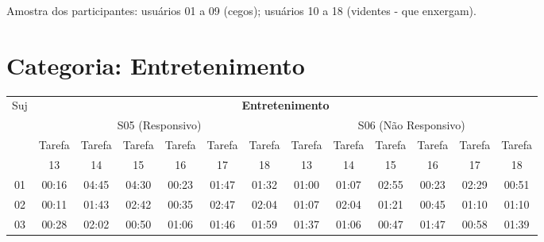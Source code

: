 Amostra dos participantes: usuários 01 a 09 (cegos); usuários 10 a 18 (videntes - que enxergam).

\section{Categoria: Entretenimento}

\footnotesize%
\begin{center}
\begin{sideways}
\begin{tabular}{|l|l|l|l|l|l|l|l|l|l|l|l|l|}
\hline
Suj & \multicolumn{12}{c|}{\textbf{Entretenimento}} \\ 
\cline{2-13}
 & \multicolumn{6}{c|}{S05 (Responsivo)} 
 & \multicolumn{6}{c|}{S06 (Não Responsivo)} \\ 
\cline{2-13}
 & \multicolumn{1}{c|}{Tarefa} & Tarefa & Tarefa & Tarefa & Tarefa & Tarefa & Tarefa & Tarefa & Tarefa & Tarefa & Tarefa & Tarefa \\ 
 & \multicolumn{1}{c|}{13} & \multicolumn{1}{c|}{14} & \multicolumn{1}{c|}{15} & \multicolumn{1}{c|}{16} & \multicolumn{1}{c|}{17} & \multicolumn{1}{c|}{18} & \multicolumn{1}{c|}{13} & \multicolumn{1}{c|}{14} & \multicolumn{1}{c|}{15} & \multicolumn{1}{c|}{16} & \multicolumn{1}{c|}{17} & \multicolumn{1}{c|}{18} \\ 
\hline
\multicolumn{1}{|c|}{01} & \multicolumn{1}{c|}{00:16} & \multicolumn{1}{c|}{04:45} & \multicolumn{1}{c|}{04:30} & \multicolumn{1}{c|}{00:23} & \multicolumn{1}{c|}{01:47} & \multicolumn{1}{c|}{01:32} & \multicolumn{1}{c|}{01:00} & \multicolumn{1}{c|}{01:07} & \multicolumn{1}{c|}{02:55} & \multicolumn{1}{c|}{00:23} & \multicolumn{1}{c|}{02:29} & \multicolumn{1}{c|}{00:51} \\ 
\hline
\multicolumn{1}{|c|}{02} & \multicolumn{1}{c|}{00:11} & \multicolumn{1}{c|}{01:43} & \multicolumn{1}{c|}{02:42} & \multicolumn{1}{c|}{00:35} & \multicolumn{1}{c|}{02:47} & \multicolumn{1}{c|}{02:04} & \multicolumn{1}{c|}{01:07} & \multicolumn{1}{c|}{02:04} & \multicolumn{1}{c|}{01:21} & \multicolumn{1}{c|}{00:45} & \multicolumn{1}{c|}{01:10} & \multicolumn{1}{c|}{01:10} \\ 
\hline
\multicolumn{1}{|c|}{03} & 
\multicolumn{1}{c|}{00:28} & \multicolumn{1}{c|}{02:02} & \multicolumn{1}{c|}{00:50} & \multicolumn{1}{c|}{01:06} & \multicolumn{1}{c|}{01:46}	& \multicolumn{1}{c|}{01:59} & \multicolumn{1}{c|}{01:37} & \multicolumn{1}{c|}{01:06} & \multicolumn{1}{c|}{00:47} & \multicolumn{1}{c|}{01:47} & \multicolumn{1}{c|}{00:58} & \multicolumn{1}{c|}{01:39} \\ 

\end{tabular}
\end{sideways}
\end{center}
